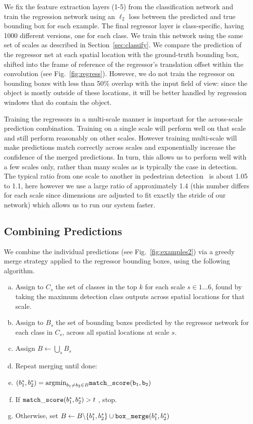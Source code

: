 \documentclass{article} %
\newcommand{\fig}[1]{Fig.~\ref{fig:#1}}
\newcommand{\secc}[1]{Section~\ref{sec:#1}}
\begin{document}
We fix the feature extraction layers (1-5) from the classification network and
train the regression network using an $\ell_2$ loss between the predicted and
true bounding box for each example.  The final regressor layer is
class-specific, having 1000 different versions, one for each class.  We train
this network using the same set of scales as described in \secc{classify}.  We
compare the prediction of the regressor net at each spatial location with the
ground-truth bounding box, shifted into the frame of reference of the
regressor's translation offset within the convolution (see \fig{regress}).
However, we do not train the regressor on bounding boxes with less than 50\%
overlap with the input field of view:
since the object is mostly outside of these locations,
it will be better handled by regression windows that do contain the object.

Training the regressors in a multi-scale manner is important for the
across-scale prediction combination. Training on a single scale will perform well
on that scale and still perform reasonably on other scales.
However training multi-scale will make predictions match correctly across scales and
exponentially increase the confidence of the merged predictions.
In turn, this allows us to perform well with a few scales only, rather than many scales
as is typically the case in detection. The typical ratio from one scale to another
in pedestrian detection~\cite{sermanet-cvpr-13} is about 1.05 to 1.1,
here however we use a large ratio of
approximately 1.4 (this number differs for each scale since dimensions are adjusted
to fit exactly the stride of our network) which allows us to run our system faster.

\subsection{Combining Predictions}

We combine the individual predictions (see \fig{examples2})
via a greedy merge strategy applied to the
regressor bounding boxes, using the following algorithm.

\begin{enumerate}[(a)]
\item  Assign to $C_s$ the set of classes in the top $k$ for each scale $s \in 1\dots 6$, found by taking the maximum detection class outputs across spatial locations for that scale.
\item  Assign to $B_s$ the set of bounding boxes predicted by the regressor network for each class in $C_s$, across all spatial locations at scale $s$.
\item  Assign $B \leftarrow \bigcup_s B_s$
\item  Repeat merging until done:
\item  \quad $(b_1^*, b_2^*) = {\rm argmin}_{b_1\ne b_2 \in B} {\tt match\_score(b_1, b_2)}$
\item  \quad If ${\tt match\_score}(b_1^*, b_2^*) > t$ , stop.
\item  \quad Otherwise, set $B \leftarrow B \backslash \{b_1^*, b_2^*\} \cup {\tt box\_merge}(b_1^*, b_2^*)$
\end{enumerate}
\end{document}
